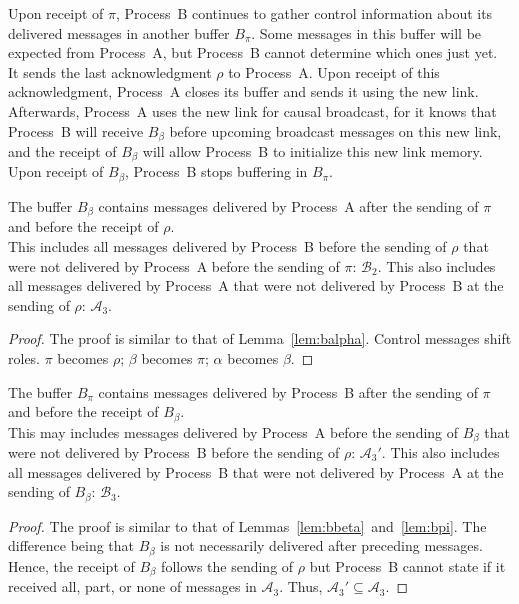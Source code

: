 \noindent Upon receipt of $\pi$, Process~B continues to gather control
information about its delivered messages in another buffer $B_\pi$. Some
messages in this buffer will be expected from Process~A, but Process~B cannot
determine which ones just yet. It sends the last acknowledgment $\rho$ to
Process~A. Upon receipt of this acknowledgment, Process~A closes its buffer and
sends it using the new link. Afterwards, Process~A uses the new link for causal
broadcast, for it knows that Process~B will receive $B_\beta$ before upcoming
broadcast messages on this new link, and the receipt of $B_\beta$ will allow
Process~B to initialize this new link memory. \\
\noindent Upon receipt of $B_\beta$, Process~B stops buffering in $B_\pi$.

\begin{lemma}
  The buffer $B_\beta$ contains messages delivered by Process~A after the
  sending of $\pi$ and before the receipt of $\rho$.\\
  This includes all messages delivered by Process~B before the sending of
  $\rho$ that were not delivered by Process~A before the sending of $\pi$:
  $\mathcal{B}_2$. This also includes all messages delivered by Process~A that
  were not delivered by Process~B at the sending of $\rho$: $\mathcal{A}_3$.
\end{lemma}
  
\begin{proof}
  The proof is similar to that of Lemma~\ref{lem:balpha}. Control messages
  shift roles. $\pi$ becomes $\rho$; $\beta$ becomes $\pi$; $\alpha$ becomes
  $\beta$.
\end{proof}
  
\begin{lemma}
  The buffer $B_\pi$ contains messages delivered by Process~B after the
  sending of $\pi$ and before the receipt of $B_\beta$.\\
  This may includes messages delivered by Process~A before the sending of
  $B_\beta$ that were not delivered by Process~B before the sending of $\rho$:
  $\mathcal{A}_3'$. This also includes all messages delivered by Process~B that
  were not delivered by Process~A at the sending of $B_\beta$:
  $\mathcal{B}_3$. 
\end{lemma}

\begin{proof}
  The proof is similar to that of Lemmas~\ref{lem:bbeta}~and~\ref{lem:bpi}. The
  difference being that $B_\beta$ is not necessarily delivered after preceding
  messages. Hence, the receipt of $B_\beta$ follows the sending of $\rho$ but
  Process~B cannot state if it received all, part, or none of messages in
  $\mathcal{A}_3$. Thus, $\mathcal{A}_3' \subseteq \mathcal{A}_3$.
\end{proof}

